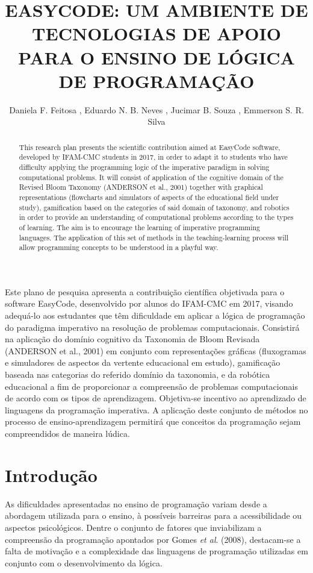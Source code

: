 \documentclass[12pt]{article}
\title{EASYCODE: UM AMBIENTE DE TECNOLOGIAS DE APOIO PARA O ENSINO DE LÓGICA DE PROGRAMAÇÃO}
\author{Daniela F. Feitosa \inst{1}, Eduardo N. B. Neves \inst{2}, Jucimar B. Souza \inst{1}, Emmerson S. R. Silva \inst{3} }
\begin{document}
 

\maketitle

\begin{abstract}
This research plan presents the scientific contribution aimed at EasyCode software, developed by IFAM-CMC students in 2017, in order to adapt it to students who have difficulty applying the programming logic of the imperative paradigm in solving computational problems. It will consist of application of the cognitive domain of the Revised Bloom Taxonomy (ANDERSON et al., 2001) together with graphical representations (flowcharts and simulators of aspects of the educational field under study), gamification based on the categories of said domain of taxonomy, and robotics in order to provide an understanding of computational problems according to the types of learning. The aim is to encourage the learning of imperative programming languages. The application of this set of methods in the teaching-learning process will allow programming concepts to be understood in a playful way.
\end{abstract}
     
\begin{resumo}
Este plano de pesquisa apresenta a contribuição científica objetivada para o software EasyCode, desenvolvido por alunos do IFAM-CMC em 2017, visando adequá-lo aos estudantes que têm dificuldade em aplicar a lógica de programação do paradigma imperativo na resolução de problemas computacionais. Consistirá na aplicação do domínio cognitivo da Taxonomia de Bloom Revisada (ANDERSON et al., 2001) em conjunto com representações gráficas (fluxogramas e simuladores de aspectos da vertente educacional em estudo), gamificação baseada nas categorias do referido domínio da taxonomia, e da robótica educacional a fim de proporcionar a compreensão de problemas computacionais de acordo com os tipos de aprendizagem. Objetiva-se incentivo ao aprendizado de linguagens da programação imperativa. A aplicação deste conjunto de métodos no processo de ensino-aprendizagem permitirá que conceitos da programação sejam compreendidos de maneira lúdica.
\end{resumo}

\section{Introdução}
As dificuldades apresentadas no ensino de programação variam desde a abordagem utilizada para o ensino, à possíveis barreiras para a acessibilidade ou aspectos psicológicos. Dentre o conjunto de fatores que inviabilizam a compreensão da programação apontados por Gomes \textit{et al}. (2008), destacam-se a falta de motivação e a complexidade das linguagens de programação utilizadas em conjunto com o 	desenvolvimento da lógica.
\end{document}
